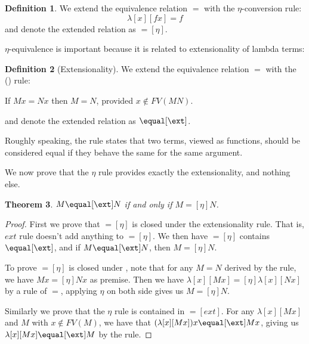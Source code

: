 \documentclass[10pt,a4paper]{article}
\theoremstyle{plain}
\newtheorem{thm}{Theorem}[section]
\theoremstyle{definition}
\newtheorem{defn}[thm]{Definition}
\theoremstyle{remark}
\providecommand{\lambd}{\ensuremath{\lambda}}
\begin{document}
\begin{defn}
  We extend the equivalence relation $\equal$ with the $\eta$-conversion rule:
  \[
  \lambd[x][f x] \equal f
  \]
  and denote the extended relation as $\equal[\eta]$.
\end{defn}

$\eta$-equivalence is important because it is related to extensionality
of lambda terms:

\begin{defn}[Extensionality]
  We extend the equivalence relation $\equal$ with the (\ext) rule:
  \begin{center}
  If $Mx \equal Nx$ then $M \equal N$, provided $x \notin FV(MN)$.
  \end{center}
  and denote the extended relation as $\equal[\ext]$.
\end{defn}

Roughly speaking, the rule states that two terms, viewed as functions,
should be considered equal if they behave the same for the same
argument.

We now prove that the $\eta$ rule provides exactly the extensionality,
and nothing else.

\begin{thm}
  $M \equal[\ext] N$ if and only if $M \equal[\eta] N$.
\end{thm}

\begin{proof}
  First we prove that $\equal[\eta]$ is closed under the
  extensionality rule. That is, $ext$ rule doesn't add anything to
  $\equal[\eta]$. We then have $\equal[\eta]$ contains $\equal[\ext]$,
  and if $M \equal[\ext] N$, then $M \equal[\eta] N$.

  To prove $\equal[\eta]$ is closed under \ext, note that for any $M
  \equal N$ derived by the \ext{} rule, we have $Mx
  \equal[\eta] Nx$ as premise. Then we have $\lambd[x][Mx]
  \equal[\eta] \lambd[x][Nx]$ by a rule of $\equal$, applying $\eta$
  on both side gives us $M \equal[\eta] N$.

  Similarly we prove that the $\eta$ rule is contained in
  $\equal[ext]$. For any $\lambd[x][Mx]$ and $M$ with $x \notin
  FV(M)$, we have that $(\lambd[x][Mx])x \equal[\ext] Mx$,
  giving us $\lambd[x][Mx] \equal[\ext] M$ by the \ext{} rule.
\end{proof}


\end{document}
